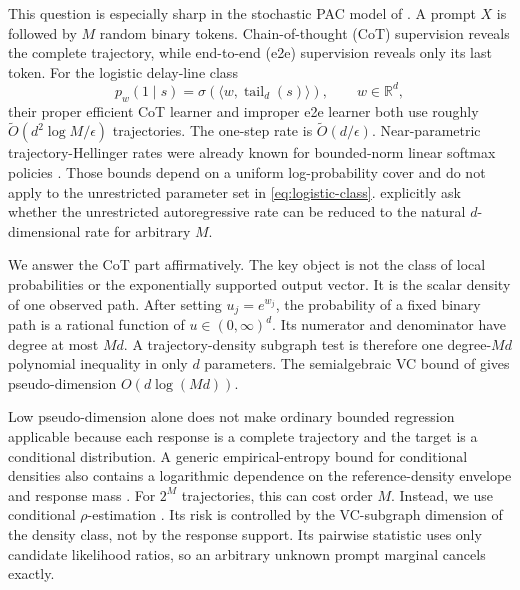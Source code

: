 \documentclass[twoside]{article}
\newcommand{\R}{\mathbb R}
\begin{document}
This question is especially sharp in the stochastic PAC model of \citet{doron2026stochastic}. A prompt $X$ is followed by $M$ random binary tokens. Chain-of-thought (CoT) supervision reveals the complete trajectory, while end-to-end (e2e) supervision reveals only its last token. For the logistic delay-line class
\begin{equation}
 p_w(1\mid s)=\sigma\!\left(\langle w,\operatorname{tail}_d(s)\rangle\right),
 \qquad w\in\R^d,
 \label{eq:logistic-class}
\end{equation}
their proper efficient CoT learner and improper e2e learner both use roughly $\widetilde O(d^2\log M/\epsilon)$ trajectories. The one-step rate is $\widetilde O(d/\epsilon)$. Near-parametric trajectory-Hellinger rates were already known for bounded-norm linear softmax policies \citep{foster2024}. Those bounds depend on a uniform log-probability cover and do not apply to the unrestricted parameter set in \eqref{eq:logistic-class}. \citet{doron2026stochastic} explicitly ask whether the unrestricted autoregressive rate can be reduced to the natural $d$-dimensional rate for arbitrary $M$.

We answer the CoT part affirmatively. The key object is not the class of local probabilities or the exponentially supported output vector. It is the scalar density of one observed path. After setting $u_j=e^{w_j}$, the probability of a fixed binary path is a rational function of $u\in(0,\infty)^d$. Its numerator and denominator have degree at most $Md$. A trajectory-density subgraph test is therefore one degree-$Md$ polynomial inequality in only $d$ parameters. The semialgebraic VC bound of \citet{goldberg1995} gives pseudo-dimension $O(d\log(Md))$.

Low pseudo-dimension alone does not make ordinary bounded regression applicable because each response is a complete trajectory and the target is a conditional distribution. A generic empirical-entropy bound for conditional densities also contains a logarithmic dependence on the reference-density envelope and response mass \citep{bilodeau2023}. For $2^M$ trajectories, this can cost order $M$. Instead, we use conditional $\rho$-estimation \citep{baraud2018}. Its risk is controlled by the VC-subgraph dimension of the density class, not by the response support. Its pairwise statistic uses only candidate likelihood ratios, so an arbitrary unknown prompt marginal cancels exactly.
\end{document}
